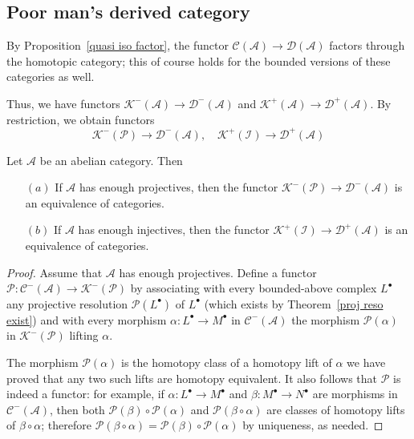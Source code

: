 \subsection{Poor man's derived category}
By Proposition~\ref{quasi iso factor}, the functor $\mathcal{C}(\mathcal{A})\to\mathcal{D}(\mathcal{A})$ factors through the homotopic category; this of course holds for the bounded versions of these categories as well.\par
Thus, we have functors $\mathcal{K}^-(\mathcal{A})\to\mathcal{D}^-(\mathcal{A})$ and $\mathcal{K}^+(\mathcal{A})\to\mathcal{D}^+(\mathcal{A})$. By restriction, we obtain functors
\[\mathcal{K}^-(\mathcal{P})\to\mathcal{D}^-(\mathcal{A}),\quad\mathcal{K}^+(\mathcal{I})\to\mathcal{D}^+(\mathcal{A})\]
\begin{theorem}\label{der cat equiv homo cat}
Let $\mathcal{A}$ be an abelian category. Then
\begin{itemize}
\item[$(a)$] If $\mathcal{A}$ has enough projectives, then the functor $\mathcal{K}^-(\mathcal{P})\to\mathcal{D}^-(\mathcal{A})$ is an equivalence of categories.
\item[$(b)$] If $\mathcal{A}$ has enough injectives, then the functor $\mathcal{K}^+(\mathcal{I})\to\mathcal{D}^+(\mathcal{A})$ is an equivalence of categories.
\end{itemize}
\end{theorem}
\begin{proof}
Assume that $\mathcal{A}$ has enough projectives. Define a functor $\mathscr{P}:\mathcal{C}^-(\mathcal{A})\to\mathcal{K}^-(\mathcal{P})$ by associating with every 
bounded-above complex $L^\bullet$ any projective resolution $\mathscr{P}(L^\bullet)$ of $L^\bullet$ (which exists by Theorem~\ref{proj reso exist}) and with every 
morphism $\alpha:L^\bullet\to M^\bullet$ in $\mathcal{C}^-(\mathcal{A})$ the morphism $\mathscr{P}(\alpha)$ in $\mathcal{K}^-(\mathcal{P})$ lifting $\alpha$.\par
The morphism $\mathscr{P}(\alpha)$ is the homotopy class of a homotopy lift of $\alpha$ we have proved that any two such lifts are homotopy equivalent. It also follows 
that $\mathscr{P}$ is indeed a functor: for example, if $\alpha:L^\bullet\to M^\bullet$ and $\beta:M^\bullet\to N^\bullet$ are morphisms in $\mathcal{C}^-(\mathcal{A})$, 
then both $\mathscr{P}(\beta)\circ\mathscr{P}(\alpha)$ and $\mathscr{P}(\beta\circ\alpha)$ are classes of homotopy lifts of $\beta\circ\alpha$; therefore 
$\mathscr{P}(\beta\circ\alpha)=\mathscr{P}(\beta)\circ\mathscr{P}(\alpha)$ by uniqueness, as needed.
\end{proof}

